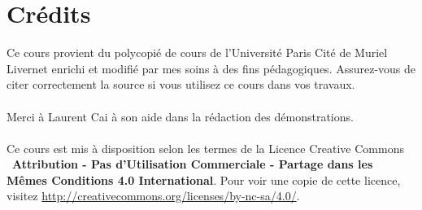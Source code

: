 \documentclass{article}
\begin{document}
\newpage
\tableofcontents 
\section*{Crédits}
Ce cours provient du polycopié de cours de l'Université Paris Cité de Muriel Livernet enrichi et modifié par mes soins à des fins pédagogiques. Assurez-vous de citer correctement la source si vous utilisez ce cours dans vos travaux.\\\\
Merci à Laurent Cai à son aide dans la rédaction des démonstrations.\\\\
Ce cours est mis à disposition selon les termes de la Licence Creative Commons \ccbyncsa\ \textbf{Attribution - Pas d'Utilisation Commerciale - Partage dans les Mêmes Conditions 4.0 International}. 
Pour voir une copie de cette licence, visitez \url{http://creativecommons.org/licenses/by-nc-sa/4.0/}.
\end{document}
